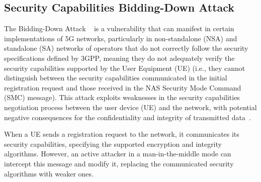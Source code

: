 \documentclass[english]{article}
\begin{document}


\subsection{Security Capabilities Bidding-Down Attack}
The Bidding-Down Attack ~\cite{eleftherakis2024demystifying} is a vulnerability
that can manifest in certain implementations of 5G networks, particularly in
non-standalone (NSA) and standalone (SA) networks of operators that do not
correctly follow the security specifications defined by 3GPP, meaning they do
not adequately verify the security capabilities supported by the User Equipment
(UE) (i.e., they cannot distinguish between the security capabilities
communicated in the initial registration request and those received in the NAS
Security Mode Command (SMC) message). This attack exploits weaknesses in the
security capabilities negotiation process between the user device (UE) and the
network, with potential negative consequences for the confidentiality and
integrity of transmitted data~\cite{eleftherakis2024demystifying}.

When a UE sends a registration request to the network, it communicates its
security capabilities, specifying the supported encryption and integrity
algorithms. However, an active attacker in a man-in-the-middle mode can
intercept this message and modify it, replacing the communicated security
algorithms with weaker ones.
\end{document}
